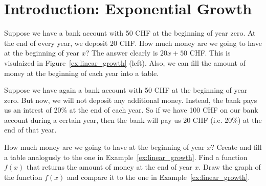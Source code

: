 \section*{Introduction: Exponential Growth}
\begin{example} \label{ex:linear_growth}
	Suppose we have a bank account with 50 CHF at the beginning of year zero.
	At the end of every year, we deposit 20 CHF.
	How much money are we going to have at the beginning of year $x$?
	The answer clearly is $20x+50$ CHF.
	This is visulaized in Figure~\ref{ex:linear_growth} (left).
	Also, we can fill the amount of money at the beginning of each year into a table.
	\begin{figure}[ht]
	\centering
	\end{figure}
\end{example}
\begin{exercise} \label{ex:exponential_growth}
	Suppose we have again a bank account with 50 CHF at the beginning of year zero.
	But now, we will not deposit any additional money.
	Instead, the bank pays us an intrest of 20\% at the end of each year.
	So if we have 100 CHF on our bank account during a certain year, then the bank will pay us 20 CHF (i.e. 20\%) at the end of that year.
	\begin{tasks}
		\task How much money are we going to have at the beginning of year $x$? Create and fill a table analogusly to the one in Example~\ref{ex:linear_growth}.
		\task Find a function $f\left(x\right)$ that returns the amount of money at the end of year $x$.
		\task Draw the graph of the function $f\left(x\right)$ and compare it to the one in Example~\ref{ex:linear_growth}.
	\end{tasks}
\end{exercise}
